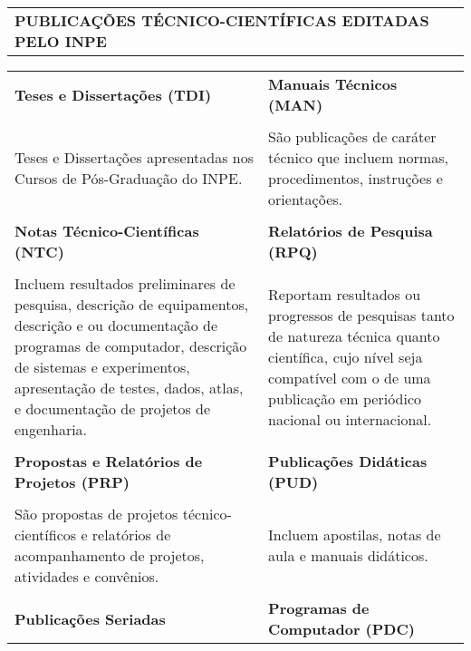 
\thispagestyle{empty}
 \begin{table}
  \begin{center}
   \begin{tabularx}{\textwidth}{X}
   \textbf{PUBLICAÇÕES TÉCNICO-CIENTÍFICAS EDITADAS PELO INPE}
  \end{tabularx} 
  \end{center}
 \end{table}
  
 \begin{table}
\begin{center}
\begin{tabularx}{\textwidth}{>{\raggedright\arraybackslash}X >{\raggedright\arraybackslash}X}      
  \textbf{Teses e Dissertações (TDI)}              & \textbf{Manuais Técnicos (MAN)}\\
\\
Teses e Dissertações apresentadas nos Cursos de Pós-Graduação do INPE.	&
São publicações de caráter técnico que incluem normas, procedimentos, instruções e orientações.\\
\\
\textbf{Notas Técnico-Científicas (NTC)}           & \textbf{Relatórios de Pesquisa (RPQ)}\\
\\
Incluem resultados preliminares de pesquisa, descrição de equipamentos, descrição e ou documentação de programas de computador, descrição de sistemas e experimentos, apresentação de testes, dados, atlas, e documentação de projetos de engenharia. 
&	
Reportam resultados ou progressos de pesquisas tanto de natureza técnica quanto científica, cujo nível seja compatível com o de uma publicação em periódico nacional ou internacional.\\
\\
\textbf{Propostas e Relatórios de Projetos (PRP)}	& \textbf{Publicações Didáticas (PUD)} 
\\
\\
São propostas de projetos técnico-científicos e relatórios de acompanhamento de projetos, atividades e convênios.
&	
Incluem apostilas, notas de aula e manuais didáticos. \\
\\         
\textbf{Publicações Seriadas} 	& \textbf{Programas de Computador (PDC)}\\

\end{tabularx}
\end{center}
\end{table}
